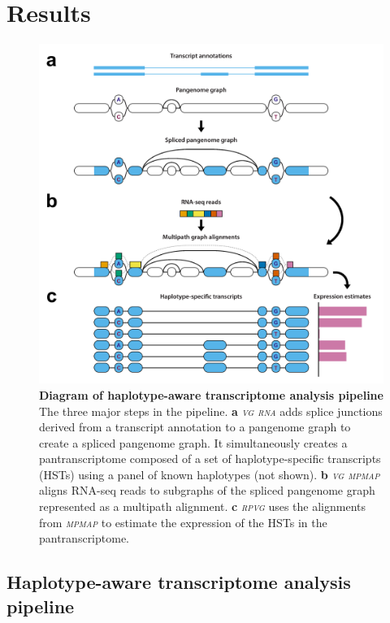 \documentclass[11pt]{ucthesis}
\newcommand{\tool}[1]{\emph{\textsc{#1}}}
\begin{document}
\section{Results}

\begin{figure}[h!]
\ssp
\begin{center}
\includegraphics[width=.75\textwidth]{mpmapfigures/figure1.pdf}
\caption{\textbf{Diagram of haplotype-aware transcriptome analysis pipeline} \\
The three major steps in the pipeline. \textbf{a} \tool{vg rna} adds splice junctions derived from a transcript annotation to a pangenome graph to create a spliced pangenome graph. It simultaneously creates a pantranscriptome composed of a set of haplotype-specific transcripts (HSTs) using a panel of known haplotypes (not shown). \textbf{b} \tool{vg mpmap} aligns RNA-seq reads to subgraphs of the spliced pangenome graph represented as a multipath alignment. \textbf{c} \tool{rpvg} uses the alignments from \tool{mpmap} to estimate the expression of the HSTs in the pantranscriptome.
} \label{fig:overview}
\end{center}
\end{figure}

\subsection{Haplotype-aware transcriptome analysis pipeline}
\end{document}
